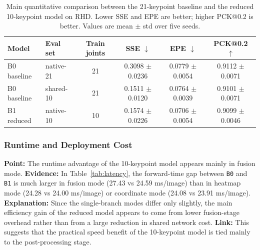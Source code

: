 \documentclass[10pt,letterpaper]{article}
\begin{document}
\begin{table}[H]
\centering
\footnotesize
\caption{Main quantitative comparison between the 21-keypoint baseline and the reduced 10-keypoint model on RHD. Lower SSE and EPE are better; higher PCK@0.2 is better. Values are mean $\pm$ std over five seeds.}
\label{tab:main_accuracy}
\begin{tabular}{llcccc}
\toprule
Model & Eval set & Train joints & SSE $\downarrow$ & EPE $\downarrow$ & PCK@0.2 $\uparrow$ \\
\midrule
B0 baseline & native-21 & 21 & 0.3098 $\pm$ 0.0236 & 0.0779 $\pm$ 0.0054 & 0.9112 $\pm$ 0.0071 \\
B0 baseline & shared-10 & 21 & 0.1511 $\pm$ 0.0120 & 0.0764 $\pm$ 0.0039 & 0.9101 $\pm$ 0.0071 \\
B1 reduced & native-10 & 10 & 0.1574 $\pm$ 0.0226 & 0.0706 $\pm$ 0.0054 & 0.9099 $\pm$ 0.0046 \\
\bottomrule
\end{tabular}
\end{table}

\subsubsection{Runtime and Deployment Cost}

\medskip
\noindent\textbf{Point:} The runtime advantage of the 10-keypoint model appears mainly in fusion mode.  
\textbf{Evidence:} In Table~\ref{tab:latency}, the forward-time gap between \texttt{B0} and \texttt{B1} is much larger in fusion mode (27.43 vs 24.59 ms/image) than in heatmap mode (24.28 vs 24.00 ms/image) or coordinate mode (24.08 vs 23.91 ms/image).  
\textbf{Explanation:} Since the single-branch modes differ only slightly, the main efficiency gain of the reduced model appears to come from lower fusion-stage overhead rather than from a large reduction in shared network cost.  
\textbf{Link:} This suggests that the practical speed benefit of the 10-keypoint model is tied mainly to the post-processing stage.
\end{document}
